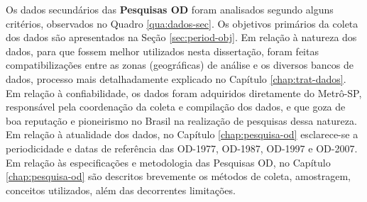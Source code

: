 Os dados secundários das \textbf{Pesquisas OD} foram analisados segundo alguns critérios, observados no Quadro \ref{qua:dados-sec}. 
Os objetivos primários da coleta dos dados são apresentados na Seção \ref{sec:period-obj}. 
Em relação à natureza dos dados, para que fossem melhor utilizados nesta dissertação, foram feitas compatibilizações entre as zonas (geográficas) de análise e os diversos bancos de dados, processo mais detalhadamente explicado no Capítulo \ref{chap:trat-dados}. 
Em relação à confiabilidade, os dados foram adquiridos diretamente do Metrô-SP, responsável pela coordenação da coleta e compilação dos dados, e que goza de boa reputação e pioneirismo no Brasil na realização de pesquisas dessa natureza. 
Em relação à atualidade dos dados, no Capítulo \ref{chap:pesquisa-od} esclarece-se a periodicidade e datas de referência das OD-1977, OD-1987, OD-1997 e OD-2007. 
Em relação às especificações e metodologia das Pesquisas OD, no Capítulo \ref{chap:pesquisa-od} são descritos brevemente os métodos de coleta, amostragem, conceitos utilizados, além das decorrentes limitações.

\begin{quadro}[htb]
\end{quadro}

